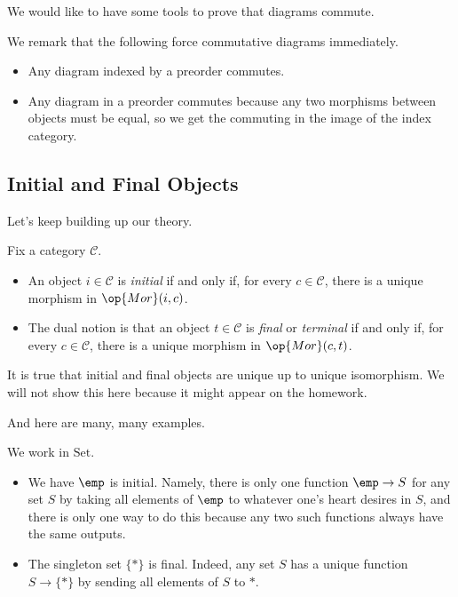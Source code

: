 We would like to have some tools to prove that diagrams commute.
\begin{remark}
	We remark that the following force commutative diagrams immediately.
	\begin{itemize}
		\item Any diagram indexed by a preorder commutes.
		\item Any diagram in a preorder commutes because any two morphisms between objects must be equal, so we get the commuting in the image of the index category.
	\end{itemize}
\end{remark}

\subsection{Initial and Final Objects}
Let's keep building up our theory.
\begin{definition}
	Fix a category $\mathcal C$.
	\begin{itemize}
		\item An object $i\in\mathcal C$ is \textit{initial} if and only if, for every $c\in\mathcal C$, there is a unique morphism in $\op{Mor}(i,c)$.
		\item The dual notion is that an object $t\in\mathcal C$ is \textit{final} or \textit{terminal} if and only if, for every $c\in\mathcal C$, there is a unique morphism in $\op{Mor}(c,t)$.
	\end{itemize}
\end{definition}
\begin{remark}
	It is true that initial and final objects are unique up to unique isomorphism. We will not show this here because it might appear on the homework.
\end{remark}
And here are many, many examples.
\begin{example}
	We work in $\mathrm{Set}$.
	\begin{itemize}
		\item We have $\emp$ is initial. Namely, there is only one function $\emp\to S$ for any set $S$ by taking all elements of $\emp$ to whatever one's heart desires in $S$, and there is only one way to do this because any two such functions always have the same outputs.
		\item The singleton set $\{*\}$ is final. Indeed, any set $S$ has a unique function $S\to\{*\}$ by sending all elements of $S$ to $*$.
	\end{itemize}
\end{example}
